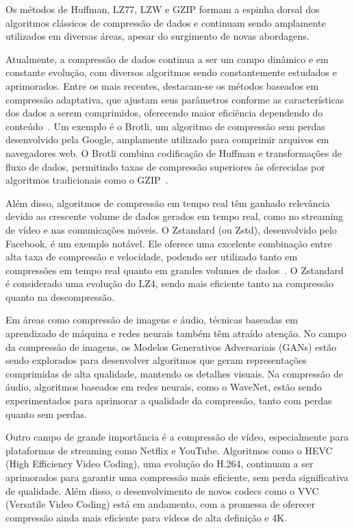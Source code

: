 Os métodos de Huffman, LZ77, LZW e GZIP formam a espinha dorsal dos algoritmos clássicos de compressão de dados e continuam sendo amplamente utilizados em diversas áreas, apesar do surgimento de novas abordagens.  

Atualmente, a compressão de dados continua a ser um campo dinâmico e em constante evolução, com diversos algoritmos sendo constantemente estudados e aprimorados. Entre os mais recentes, destacam-se os métodos baseados em compressão adaptativa, que ajustam seus parâmetros conforme as características dos dados a serem comprimidos, oferecendo maior eficiência dependendo do conteúdo~\cite{salomon2007data}. Um exemplo é o Brotli, um algoritmo de compressão sem perdas desenvolvido pela Google, amplamente utilizado para comprimir arquivos em navegadores web. O Brotli combina codificação de Huffman e transformações de fluxo de dados, permitindo taxas de compressão superiores às oferecidas por algoritmos tradicionais como o GZIP~\cite{alakuijala2016brotli}.  

Além disso, algoritmos de compressão em tempo real têm ganhado relevância devido ao crescente volume de dados gerados em tempo real, como no streaming de vídeo e nas comunicações móveis. O Zstandard (ou Zstd), desenvolvido pelo Facebook, é um exemplo notável. Ele oferece uma excelente combinação entre alta taxa de compressão e velocidade, podendo ser utilizado tanto em compressões em tempo real quanto em grandes volumes de dados~\cite{collet2016zstandard}. O Zstandard é considerado uma evolução do LZ4, sendo mais eficiente tanto na compressão quanto na descompressão.  

Em áreas como compressão de imagens e áudio, técnicas baseadas em aprendizado de máquina e redes neurais também têm atraído atenção. No campo da compressão de imagens, os Modelos Generativos Adversariais (GANs) estão sendo explorados para desenvolver algoritmos que geram representações comprimidas de alta qualidade, mantendo os detalhes visuais. Na compressão de áudio, algoritmos baseados em redes neurais, como o WaveNet, estão sendo experimentados para aprimorar a qualidade da compressão, tanto com perdas quanto sem perdas.  

Outro campo de grande importância é a compressão de vídeo, especialmente para plataformas de streaming como Netflix e YouTube. Algoritmos como o HEVC (High Efficiency Video Coding), uma evolução do H.264, continuam a ser aprimorados para garantir uma compressão mais eficiente, sem perda significativa de qualidade. Além disso, o desenvolvimento de novos codecs como o VVC (Versatile Video Coding) está em andamento, com a promessa de oferecer compressão ainda mais eficiente para vídeos de alta definição e 4K.  

